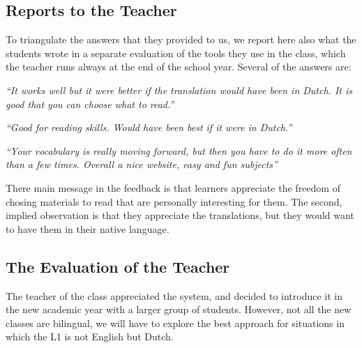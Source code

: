 \newpage
\subsection{Reports to the Teacher}
To triangulate the answers that they provided to us, we report here also what the students wrote in a separate evaluation of the tools they use in the class, which the teacher runs always at the end of the school year. Several of the answers are: 

\begin{description}
  \item {\em ``It works well but it were better if the translation would have been in Dutch. It is good that you can choose what to read.''}
  \item {\em ``Good for reading skills. Would have been best if it were in Dutch.''}
  \item {\em ``Your vocabulary is really moving forward, but then you have to do it more often than a few times. Overall a nice website, easy and fun subjects''}
\end{description}

There main message in the feedback is that learners appreciate the freedom of chosing materials to read that are personally interesting for them. The second, implied observation is that they appreciate the translations, but they would want to have them in their native language. 

\subsection{The Evaluation of the Teacher}
The teacher of the class appreciated the system, and decided to introduce it in the new academic year with a larger group of students. However, not all the new classes are bilingual, we will have to explore the best approach for situations in which the L1 is not English but Dutch.


